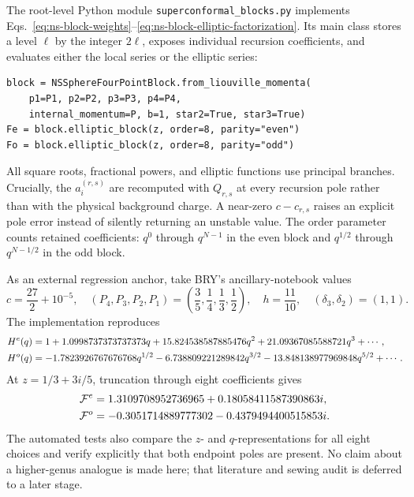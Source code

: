 \documentclass[11pt]{article}
\begin{document}
The root-level Python module
\texttt{superconformal\_}\allowbreak\texttt{blocks.py} implements
Eqs.~\eqref{eq:ns-block-weights}--\eqref{eq:ns-block-elliptic-factorization}.
Its main class stores a level $\ell$ by the integer $2\ell$, exposes
individual recursion coefficients, and evaluates either the local series or
the elliptic series:
\begin{verbatim}
block = NSSphereFourPointBlock.from_liouville_momenta(
    p1=P1, p2=P2, p3=P3, p4=P4,
    internal_momentum=P, b=1, star2=True, star3=True)
Fe = block.elliptic_block(z, order=8, parity="even")
Fo = block.elliptic_block(z, order=8, parity="odd")
\end{verbatim}
All square roots, fractional powers, and elliptic functions use principal
branches.  Crucially, the $a_i^{(r,s)}$ are recomputed with $Q_{r,s}$ at
every recursion pole rather than with the physical background charge.  A
near-zero $c-c_{r,s}$ raises an explicit pole error instead of silently
returning an unstable value.  The order parameter counts retained
coefficients: $q^0$ through $q^{N-1}$ in the even block and $q^{1/2}$
through $q^{N-1/2}$ in the odd block.

As an external regression anchor, take BRY's ancillary-notebook values
\begin{equation}
 c=\frac{27}{2}+10^{-5},\quad
 (P_4,P_3,P_2,P_1)=\left(\frac35,\frac14,\frac13,\frac12\right),\quad
 h=\frac{11}{10},\quad (\delta_3,\delta_2)=(1,1).
 \label{eq:ns-block-bry-benchmark-input}
\end{equation}
The implementation reproduces
\begin{align}
 H^e(q)&=1+1.0998737373737373q
 +15.824538587885476q^2+21.09367085588721q^3+\cdots,\notag\\
 H^o(q)&=-1.7823926767676768q^{1/2}
 -6.738809221289842q^{3/2}
 -13.848138977969848q^{5/2}+\cdots.
 \label{eq:ns-block-bry-benchmark-series}
\end{align}
At $z=1/3+3i/5$, truncation through eight coefficients gives
\begin{align}
 \mathcal F^e&=1.3109708952736965
 +0.18058411587390863i,\notag\\
 \mathcal F^o&=-0.3051714889777302
 -0.4379494400515853i.
 \label{eq:ns-block-bry-benchmark-values}
\end{align}
The automated tests also compare the $z$- and $q$-representations for all
eight choices and verify explicitly that both endpoint poles are present.
No claim about a higher-genus analogue is made here; that literature and
sewing audit is deferred to a later stage.
\end{document}
